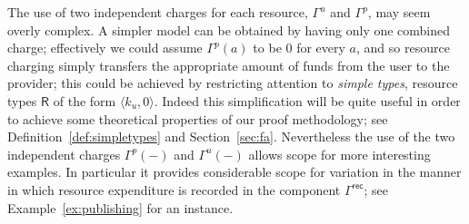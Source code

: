 \documentclass{LMCS}
\newcommand{\record}{{\scriptstyle \mathsf{rec}}}
\def\pair(#1,#2){\langle #1 , #2 \rangle}\newcommand{\parrow}{ \mathbin{\rightharpoonup}}
\newcommand{\typeletter}[1]{{\mathsf{#1}}}
\newcommand{\tR}{\typeletter{R}}
\begin{document}
The use of two independent charges for each resource, $\Gamma^u$ and
$\Gamma^p$, may seem overly complex. A simpler model can be obtained by
having only one combined charge; effectively we could assume
$\Gamma^p(a)$ to be $0$ for every $a$, and so resource charging simply
transfers the appropriate amount of funds from the user to the
provider; this could be achieved by restricting attention to
\emph{simple types}, resource types $\tR$ of the form $\pair(k_u,0)$.
Indeed this simplification will be quite useful in order to achieve
some theoretical  properties of our proof methodology; see 
Definition~\ref{def:simpletypes} and Section~\ref{sec:fa}.
Nevertheless 
the use of the two independent charges $\Gamma^p(-)$ and $\Gamma^u(-)$ allows scope for more
interesting examples. In particular it provides considerable scope for variation 
in the manner in which resource expenditure is recorded in the component $\Gamma^{\record}$;
see Example~\ref{ex:publishing} for an instance.
\end{document}
